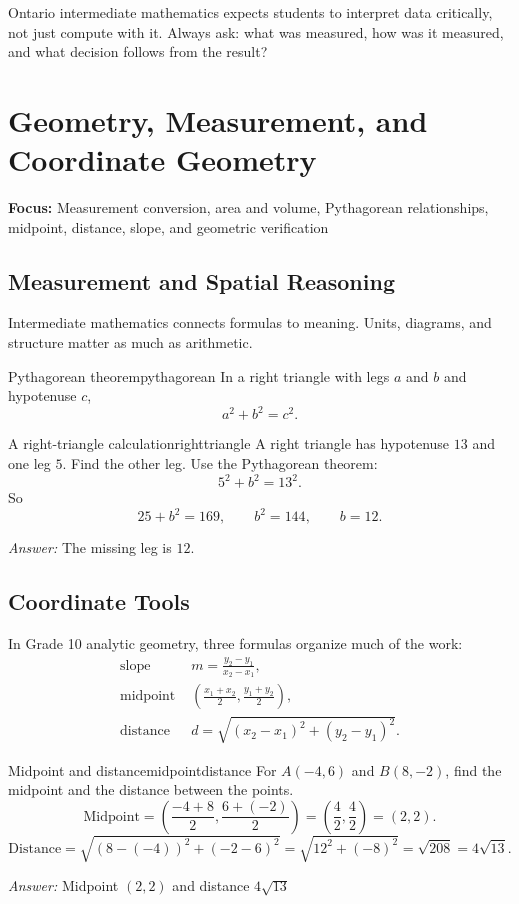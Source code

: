 \documentclass[11pt,oneside]{book}
\newcommand{\topicline}[1]{\medskip\noindent\textbf{Focus:} #1\par\medskip}
\newcommand{\answerline}{\par\smallskip\noindent\textit{Answer: }}
\begin{document}
\begin{summarybox}
Ontario intermediate mathematics expects students to interpret data critically, not just compute with it. Always ask: what was measured, how was it measured, and what decision follows from the result?
\end{summarybox}

\chapter{Geometry, Measurement, and Coordinate Geometry}
\topicline{Measurement conversion, area and volume, Pythagorean relationships, midpoint, distance, slope, and geometric verification}

\section{Measurement and Spatial Reasoning}
Intermediate mathematics connects formulas to meaning. Units, diagrams, and structure matter as much as arithmetic.

\begin{theorembox}{Pythagorean theorem}{pythagorean}
In a right triangle with legs $a$ and $b$ and hypotenuse $c$,
\[
a^2+b^2=c^2.
\]
\end{theorembox}

\begin{example}{A right-triangle calculation}{righttriangle}
A right triangle has hypotenuse $13$ and one leg $5$. Find the other leg.
\tcblower
Use the Pythagorean theorem:
\[
5^2+b^2=13^2.
\]
So
\[
25+b^2=169, \qquad b^2=144, \qquad b=12.
\]
\answerline The missing leg is $12$.
\end{example}

\section{Coordinate Tools}
In Grade 10 analytic geometry, three formulas organize much of the work:
\[
\begin{aligned}
\text{slope } &m=\frac{y_2-y_1}{x_2-x_1},\\
\text{midpoint } &\left(\frac{x_1+x_2}{2},\frac{y_1+y_2}{2}\right),\\
\text{distance } &d=\sqrt{(x_2-x_1)^2+(y_2-y_1)^2}.
\end{aligned}
\]

\begin{example}{Midpoint and distance}{midpointdistance}
For $A(-4,6)$ and $B(8,-2)$, find the midpoint and the distance between the points.
\tcblower
\[
\text{Midpoint}=\left(\frac{-4+8}{2},\frac{6+(-2)}{2}\right)=\left(\frac{4}{2},\frac{4}{2}\right)=(2,2).
\]
\[
\text{Distance}=\sqrt{(8-(-4))^2+(-2-6)^2}=\sqrt{12^2+(-8)^2}=\sqrt{208}=4\sqrt{13}.
\]
\answerline Midpoint $(2,2)$ and distance $4\sqrt{13}$
\end{example}
\end{document}
